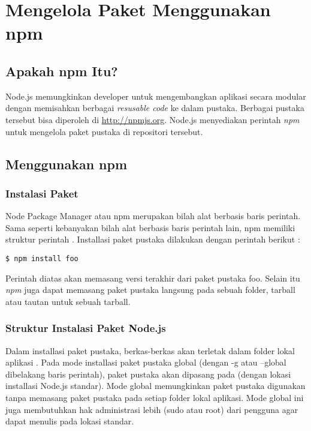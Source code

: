 \chapter{Mengelola Paket Menggunakan npm}

\section{Apakah npm Itu?}

Node.js memungkinkan developer untuk mengembangkan aplikasi secara modular dengan memisahkan berbagai \textit{resusable code} ke dalam pustaka. Berbagai pustaka tersebut bisa diperoleh di \url{http://npmjs.org}. Node.js menyediakan perintah \textit{npm} untuk mengelola paket pustaka di repositori tersebut.

\section{Menggunakan npm}

\subsection{Instalasi Paket}

Node Package Manager atau npm merupakan bilah alat berbasis baris perintah. Sama seperti kebanyakan bilah alat berbasis baris perintah lain, npm memiliki struktur perintah . Installasi paket pustaka dilakukan dengan perintah berikut :

\lstset{language=bash,caption=Hasil instalasi Flatiron}
\begin{lstlisting}
$ npm install foo
\end{lstlisting}

Perintah diatas akan memasang versi terakhir dari paket pustaka foo. Selain itu \textit{npm} juga dapat memasang paket pustaka langsung pada sebuah folder, tarball atau tautan untuk sebuah tarball.

\subsection{Struktur Instalasi Paket Node.js}

Dalam installasi paket pustaka, berkas-berkas akan terletak dalam folder lokal aplikasi . Pada mode installasi paket pustaka global (dengan -g atau --global dibelakang baris perintah), paket pustaka akan dipasang pada  (dengan lokasi installasi Node.js standar). Mode global memungkinkan paket pustaka digunakan tanpa memasang paket pustaka pada setiap folder lokal aplikasi. Mode global ini juga membutuhkan hak administrasi lebih (sudo atau root) dari pengguna agar dapat menulis pada lokasi standar.

